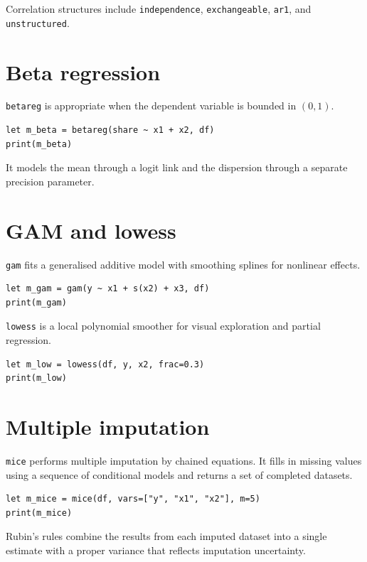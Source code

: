 Correlation structures include \texttt{independence}, \texttt{exchangeable}, \texttt{ar1}, and
\texttt{unstructured}.

\section{Beta regression}

\texttt{betareg} is appropriate when the dependent variable is bounded in
$(0,1)$.

\begin{lstlisting}[caption={Beta regression}]
let m_beta = betareg(share ~ x1 + x2, df)
print(m_beta)
\end{lstlisting}

It models the mean through a logit link and the dispersion through a
separate precision parameter.

\section{GAM and lowess}

\texttt{gam} fits a generalised additive model with smoothing splines for
nonlinear effects.

\begin{lstlisting}[caption={GAM}]
let m_gam = gam(y ~ x1 + s(x2) + x3, df)
print(m_gam)
\end{lstlisting}

\texttt{lowess} is a local polynomial smoother for visual exploration and
partial regression.

\begin{lstlisting}[caption={Lowess}]
let m_low = lowess(df, y, x2, frac=0.3)
print(m_low)
\end{lstlisting}

\section{Multiple imputation}

\texttt{mice} performs multiple imputation by chained equations. It fills in
missing values using a sequence of conditional models and returns a set
of completed datasets.

\begin{lstlisting}[caption={MICE}]
let m_mice = mice(df, vars=["y", "x1", "x2"], m=5)
print(m_mice)
\end{lstlisting}

Rubin's rules combine the results from each imputed dataset into a
single estimate with a proper variance that reflects imputation
uncertainty.
